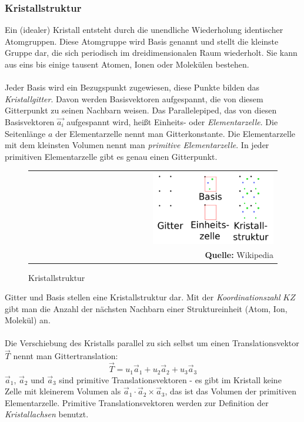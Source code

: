 \documentclass[a4paper,titlepage]{scrartcl}
\numberwithin{equation}{section}
\begin{document}
\subsubsection{Kristallstruktur}
Ein (idealer) Kristall entsteht durch die unendliche Wiederholung identischer Atomgruppen. Diese Atomgruppe wird Basis genannt und stellt die kleinste Gruppe dar, die sich periodisch im dreidimensionalen Raum wiederholt. Sie kann aus eins bis einige tausent Atomen, Ionen oder Molekülen bestehen.\\ \\
Jeder Basis wird ein Bezugspunkt zugewiesen, diese Punkte bilden das \emph{Kristallgitter}. Davon werden Basisvektoren aufgespannt, die von diesem Gitterpunkt zu seinen Nachbarn weisen. Das Parallelepiped, das von diesen Basisvektoren $\vec{a_i}$ aufgespannt wird,  heißt Einheits- oder \emph{Elementarzelle}. Die Seitenlänge $a$ der Elementarzelle nennt man Gitterkonstante. Die Elementarzelle mit dem kleinsten Volumen nennt man \emph{primitive Elementarzelle}. In jeder primitiven Elementarzelle gibt es genau einen Gitterpunkt.
\begin{figure}[H]
	\centering
	\begin{tabular}{@{}r@{}}
		\includegraphics[width=0.5\textwidth]{kristallstruktur.png}\\
		\footnotesize\sffamily\textbf{Quelle:} Wikipedia \cite{wiki:kristallstruktur}
	\end{tabular}
	\caption{Kristallstruktur}
    \label{fig:kristallstruktur}
\end{figure}
Gitter und Basis stellen eine Kristallstruktur dar. Mit der \emph{Koordinationszahl} $KZ$ gibt man die Anzahl der nächsten Nachbarn einer Struktureinheit (Atom, Ion, Molekül) an.\\ \\
Die Verschiebung des Kristalls parallel zu sich selbst um einen Translationsvektor $\vec{T}$ nennt man Gittertranslation:
\begin{equation*}
\vec{T}=u_1 \vec{a}_1 + u_2 \vec{a}_2 + u_3 \vec{a}_3
\end{equation*}
$\vec{a}_1$, $\vec{a}_2$ und $\vec{a}_3$ sind primitive Translationsvektoren - es gibt im Kristall keine Zelle mit kleinerem Volumen als $\vec{a}_1 \cdot \vec{a}_2 \times \vec{a}_3$, das ist das Volumen der primitiven Elementarzelle. Primitive Translationsvektoren werden zur Definition der \emph{Kristallachsen} benutzt.\\ \\
\end{document}
